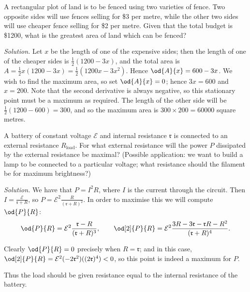 \begin{ex}
  A rectangular plot of land is to be fenced using two varieties of fence. Two opposite sides will
  use fences selling for \$3 per metre, while the other two sides will use cheaper fence selling for \$2 per metre.
  Given that the total budget is \$1200, what is the greatest area of land which can be fenced?

  \textit{Solution.} Let $ x $ be the length of one of the expensive sides; then the length of one of the cheaper
                    sides is $ \frac{1}{2}(1200 - 3x) $, and the total area is $ A = \frac{1}{2} x (1200 - 3x) = \frac{1}{2}(1200x - 3x^2) $.
                    Hence $ \od{A}{x} = 600 - 3x $. We wish to find the maximum area, so set $ \od{A}{x} = 0 $; hence $ 3x = 600 $ and $ x = 200 $.
                    Note that the second derivative is always negative, so this stationary point must be a maximum as required. The length
                    of the other side will be $ \frac{1}{2}(1200 - 600) = 300 $, and so the maximum area is $ 300 \times 200 = 60000 $ square metres.
\end{ex}

\begin{ex}
  A battery of constant voltage $ \mathcal{E} $ and internal resistance $ \mathfrak{r} $ is connected to an external resistance $ R_\text{load} $.
  For what external resistance will the power $ P $ dissipated by the external resistance be maximal? (Possible application: we want to build a
  lamp to be connected to a particular voltage; what resistance should the filament be for maximum brightness?)

  \textit{Solution.} We have that $ P = I^2 R $, where $ I $ is the current through the circuit. Then $ I = \frac{\mathcal{E}}{\mathfrak{r} + R} $,
                     so $ P = \mathcal{E}^2 \frac{R}{(\mathfrak{r} + R)^2} $. In order to maximise this we will compute $ \od{P}{R} $:
                     \begin{displaymath}
                       \od{P}{R} = \mathcal{E}^2\frac{\mathfrak{r} - R}{(\mathfrak{r} + R)^3}, \qquad \od[2]{P}{R} = \mathcal{E}^2 \frac{3R - 3\mathfrak{r} - \mathfrak{r}R - R^2}{(\mathfrak{r} + R)^4}.
                     \end{displaymath}

                     Clearly $ \od{P}{R} = 0 $ precisely when $ R = \mathfrak{r} $; and in this case, $ \od[2]{P}{R} = \mathcal{E}^2(-2\mathfrak{r}^2)((2\mathfrak{r})^4) < 0 $, so this point is indeed a maximum for $ P $.

                     Thus the load should be given resistance equal to the internal resistance of the battery.
\end{ex}

